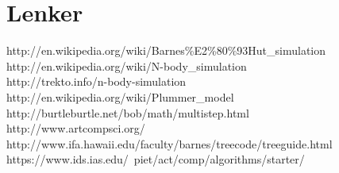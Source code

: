 \documentclass[11pt, oneside]{article}   	%
\begin{document}
\newpage
\section{Lenker}
http://en.wikipedia.org/wiki/Barnes\%E2\%80\%93Hut\_simulation\\
http://en.wikipedia.org/wiki/N-body\_simulation\\
http://trekto.info/n-body-simulation\\
http://en.wikipedia.org/wiki/Plummer\_model\\
http://burtleburtle.net/bob/math/multistep.html\\
http://www.artcompsci.org/
http://www.ifa.hawaii.edu/faculty/barnes/treecode/treeguide.html\\
https://www.ids.ias.edu/~piet/act/comp/algorithms/starter/
\end{document}
